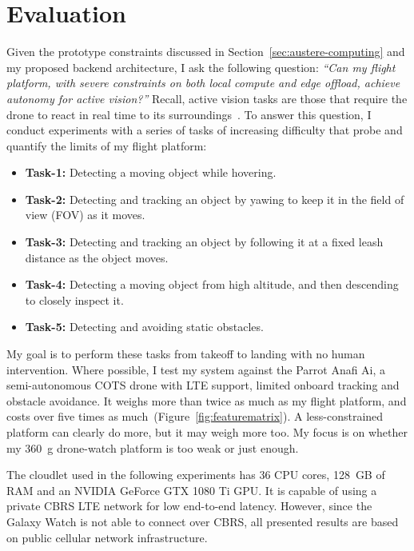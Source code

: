 
\section{Evaluation}
\label{sec:eval}

Given the prototype constraints discussed in Section~\ref{sec:austere-computing} and my proposed backend architecture, I ask the following question: 
{\em ``Can my flight platform, with severe constraints on both local compute and edge offload, achieve autonomy for active vision?''} Recall, active vision tasks are those that require the drone to react in real time to its surroundings~\cite{Aloimonos1988, Ognibene2013}. To answer this question, I conduct experiments with a series of tasks of increasing difficulty that probe and quantify the limits of my flight platform:

\begin{itemize}

\item{{\bf Task-1:} Detecting a moving object while hovering.}

\item{{\bf Task-2:} Detecting and tracking an object by yawing to keep it in
    the field of view (FOV) as it moves.}

\item{{\bf Task-3:} Detecting and tracking an object by following it at a
    fixed leash distance as the object moves.}

\item{{\bf Task-4:} Detecting a moving object from high altitude, and
    then descending to closely inspect it.  }

\item{{\bf Task-5:} Detecting and avoiding static obstacles.}

\end{itemize}

My goal is to perform these tasks from takeoff to landing with no
human intervention.  Where possible, I test my
system against the Parrot Anafi Ai, a semi-autonomous COTS drone with LTE support, limited onboard tracking and obstacle avoidance.  It weighs more
than twice as much as my flight platform, and costs over five times as much~(Figure~\ref{fig:featurematrix}).  A less-constrained platform
can clearly do more, but it may weigh more too.  My focus is on
whether my 360~g drone-watch platform is too weak or just enough.

The cloudlet used in the following experiments has 36 CPU cores, 128~GB of RAM and an NVIDIA GeForce GTX 1080
Ti GPU.  It is capable of using a private CBRS LTE network for low end-to-end latency. However, since the Galaxy Watch is not able to connect over CBRS, all presented results are based on public cellular network infrastructure.

